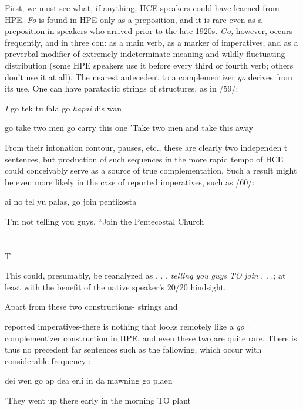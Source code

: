 First, we must see what, if anything, HCE speakers could have learned from HPE. \textit{Fo} is found in HPE only as a preposition, and it is rare even as a preposition in speakers who arrived prior to the late 1920s. \textit{Go,} however, occurs frequently, and in three con: as a main verb, as a marker of imperatives, and as a preverbal modifier of extremely indeterminate meaning and wildly fluctuating distribution (some HPE speakers use it before every third or fourth verb; others don't use it at all). The nearest antecedent to a complementizer \textit{go} derives from its  use. One can have paratactic strings of  structures, as in /59/:

\ea\label{ex:59}
\textit{I} go tek tu fala go \textit{hapai} dis wan

go take two men go carry this one 'Take two men and take this away
\glt
\z

From their intonation contour, pauses, etc., these are clearly two independen t sentences, but production of such sequences in the more rapid tempo of HCE could conceivably serve as a source of true comple\-mentation. Such a result might be even more likely in the case of reported imperatives, such as /60/:

\ea\label{ex:60}
 ai no tel yu palas, go join pentikosta
\glt
\z

'I'm not telling you guys, ``Join the Pentecostal Church 

\section{}
T


This could, presumably, be reanalyzed as . . . \textit{telling} \textit{you} \textit{guys} \textit{TO} \textit{join} . . .; at least with the benefit of the native  speaker's 20/20 hindsight.

Apart from these two constructions-  strings and

reported imperatives-there is nothing that looks remotely like a \textit{go·} complementizer construction in HPE, and even these two are quite rare. There is thus no precedent far sentences such as the fallowing, which occur with considerable frequency :

\ea\label{ex:61}
 dei wen go ap dea erli in da mawning go plaen
\glt
\z

'They went up there early in the morning TO plant


